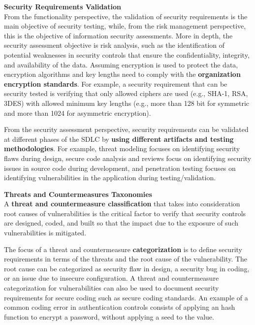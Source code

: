 		{\bf Security Requirements Validation} \\
		From the functionality perspective, the validation of security requirements is the main objective of 
		security testing, while, from the risk management perspective, this is the objective of information 
		security assessments. More in depth, the security assessment objective is risk analysis, such
		as the identification of potential weaknesses in security controls that ensure the confidentiality, 
		integrity, and availability of the data. 
		Assuming encryption is used to protect the data, encryption algorithms and key
		lengths need to comply with the {\bf organization encryption standards}. For example, a security 
		requirement that can be security tested is verifying that only allowed ciphers are used 
		(e.g., SHA-1, RSA, 3DES) with allowed minimum key lengths (e.g., more than 128 bit for symmetric 
		and more than 1024 for asymmetric encryption).

		From the security assessment perspective, security requirements can be validated at different 
		phases of the SDLC by {\bf using different artifacts and testing methodologies}. For example, threat 
		modeling focuses on identifying security flaws during design, secure code analysis and reviews 
		focus on identifying security issues in source code during development, and penetration testing 
		focuses on identifying vulnerabilities in the application during testing/validation.

		{\bf Threats and Countermeasures Taxonomies}\\
		A {\bf threat and countermeasure classification} that takes into consideration root causes of 
		vulnerabilities is the critical factor to verify that security controls are designed, coded, 
		and built so that the impact due to the exposure of such vulnerabilities is mitigated.

		The focus of a threat and countermeasure {\bf categorization} is to define security requirements 
		in terms of the threats and the root cause of the vulnerability. The root cause can be 
		categorized as security flaw in design, a security bug in coding, or an issue due to insecure 
		configuration. 	A threat and countermeasure categorization for vulnerabilities can also be used to 
		document security requirements for secure coding such as secure coding standards. An example of 
		a common coding error in authentication controls consists of applying an hash function to encrypt a 
		password, without applying a seed to the value. 


